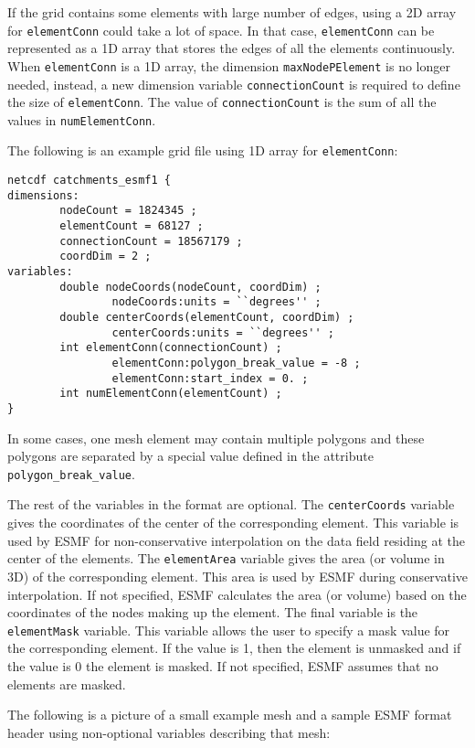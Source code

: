 If the grid contains some elements with large number of edges, using a 2D array for {\tt elementConn} could take a lot of space.  
In that case, {\tt elementConn} can be represented as a 1D array that stores the edges of all the elements continuously.  When {\tt elementConn} is a 1D array, the dimension {\tt maxNodePElement} is no longer needed, instead, a new dimension variable {\tt connectionCount}
is required to define the size of {\tt elementConn}.  The value of {\tt connectionCount} is the sum of all the values in {\tt numElementConn}.

The following is an example grid file using 1D array for {\tt elementConn}:

\begin{verbatim}
netcdf catchments_esmf1 {
dimensions:
        nodeCount = 1824345 ;
        elementCount = 68127 ;
        connectionCount = 18567179 ;
        coordDim = 2 ;
variables:
        double nodeCoords(nodeCount, coordDim) ;
                nodeCoords:units = ``degrees'' ;
        double centerCoords(elementCount, coordDim) ;
                centerCoords:units = ``degrees'' ;
        int elementConn(connectionCount) ;
                elementConn:polygon_break_value = -8 ;
                elementConn:start_index = 0. ;
        int numElementConn(elementCount) ;
}
\end{verbatim}

In some cases, one mesh element may contain multiple polygons and these polygons are separated by a special value defined in the attribute
 {\tt polygon\_break\_value}. 
   
 The rest of the variables in the format are optional. The {\tt centerCoords} variable gives the coordinates of the center of the corresponding element.
 This variable is used by ESMF for non-conservative interpolation on the data field residing at the center of the elements.  The {\tt elementArea} variable gives the area (or volume in 3D) of the corresponding element. This
 area is used by ESMF during conservative interpolation. If not specified, ESMF calculates the area (or volume) based on the coordinates of the nodes
 making up the element. The final variable is the {\tt elementMask} variable. This variable allows the user to specify a mask value for
 the corresponding element. If the value is 1, then the element is unmasked and if the value is 0 the element is masked.
 If not specified, ESMF assumes that no elements are masked.

The following is a picture of a small example mesh and a sample ESMF format header using non-optional variables describing that mesh:

